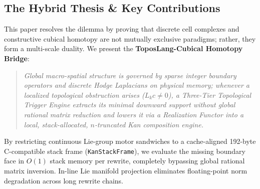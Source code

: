 \documentclass[acmsmall,screen,nonacm]{acmart}
\newcommand{\KSF}{\texttt{KanStackFrame}}
\begin{document}
\subsection{The Hybrid Thesis \& Key Contributions}
\label{sec:hybrid-thesis}

This paper resolves the dilemma by proving that discrete cell complexes and constructive cubical homotopy are not mutually exclusive paradigms; rather, they form a multi-scale duality. We present the \textbf{ToposLang-Cubical Homotopy Bridge}:
\begin{quote}
\emph{Global macro-spatial structure is governed by sparse integer boundary operators and discrete Hodge Laplacians on physical memory; whenever a localized topological obstruction arises ($L_k c \neq 0$), a Three-Tier Topological Trigger Engine extracts its minimal downward support without global rational matrix reduction and lowers it via a Realization Functor into a local, stack-allocated, $n$-truncated Kan composition engine.}
\end{quote}

By restricting continuous Lie-group motor sandwiches to a cache-aligned 192-byte C-compatible stack frame (\KSF{}), we evaluate the missing boundary face in $O(1)$ stack memory per rewrite, completely bypassing global rational matrix inversion. In-line Lie manifold projection eliminates floating-point norm degradation across long rewrite chains.
\end{document}
